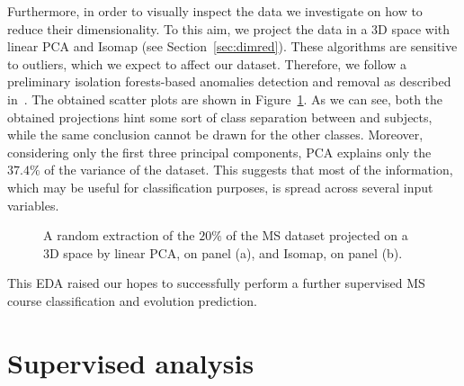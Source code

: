Furthermore, in order to visually inspect the data we investigate on how to reduce their dimensionality. To this aim, we project the data in a 3D space with linear PCA and Isomap (see Section~\ref{sec:dimred}).
These algorithms are sensitive to outliers, which we expect to affect our dataset. Therefore, we follow a preliminary isolation forests-based anomalies detection and removal as described in~\cite{liu2008isolation, liu2012isolation}.
The obtained scatter plots are shown in Figure~\ref{fig:ms_3dscatterplot}.
As we can see, both the obtained projections hint some sort of class separation between \RR and \SP subjects, while the same conclusion cannot be drawn for the other classes. Moreover, considering only the first three principal components, PCA explains only the $37.4\%$ of the variance of the dataset. This suggests that most of the information, which may be useful for classification purposes, is spread across several input variables.

\begin{figure}[h!]
	\centering
	\caption{A random extraction of the $20\%$ of the MS dataset projected on a 3D space by linear PCA, on panel (a), and Isomap, on panel (b).} \label{fig:ms_3dscatterplot}
\end{figure}

This EDA raised our hopes to successfully perform a further supervised MS course classification and evolution prediction.



\section{Supervised analysis}\label{sec:problem_description}


